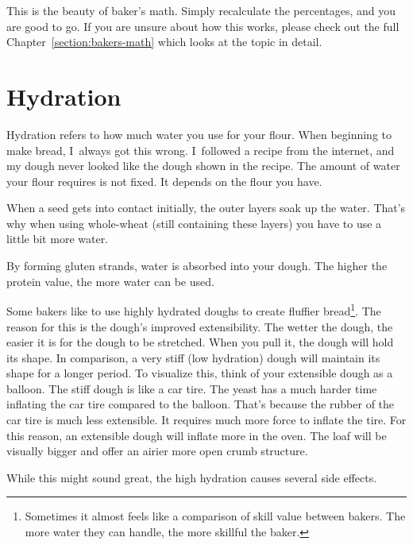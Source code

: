 This is the beauty of baker's math. Simply recalculate the percentages, and you
are good to go. If you are unsure about how this works, please check out the
full Chapter~\ref{section:bakers-math} which looks at the topic in detail.

\section{Hydration}

Hydration refers to how much water you use for your flour. When
beginning to make bread, I~always got this wrong. I~followed a recipe from the
internet, and my dough never looked like the dough shown in the recipe.
The amount of water your flour requires is not fixed. It depends on the flour
you have.

When a seed gets into contact initially, the outer layers soak up the water.
That's why when using whole-wheat (still containing these layers) you have to
use a little bit more water.

By forming gluten strands, water is absorbed into your dough. The higher the
protein value, the more water can be used.

Some bakers like to use highly hydrated doughs to create fluffier
bread\footnote{Sometimes it almost feels like a comparison of skill value
between bakers. The more water they can handle, the more skillful the baker.}.
The reason for this
is the dough's improved extensibility. The wetter the dough, the easier it is
for the dough to be stretched. When you pull it, the dough will hold its
shape. In comparison, a very stiff (low hydration) dough will maintain its
shape for a longer period. To visualize this, think of your extensible
dough as a balloon. The stiff dough is like a car tire.
The yeast has a much harder time inflating the car tire compared to the balloon.
That’s because the rubber of the car tire is much less extensible.
It requires much more force to inflate the tire. For this reason,
an extensible dough will inflate more in the oven. The loaf will
be visually bigger and offer an airier more open crumb structure.

While this might sound great, the high hydration causes several side effects.

